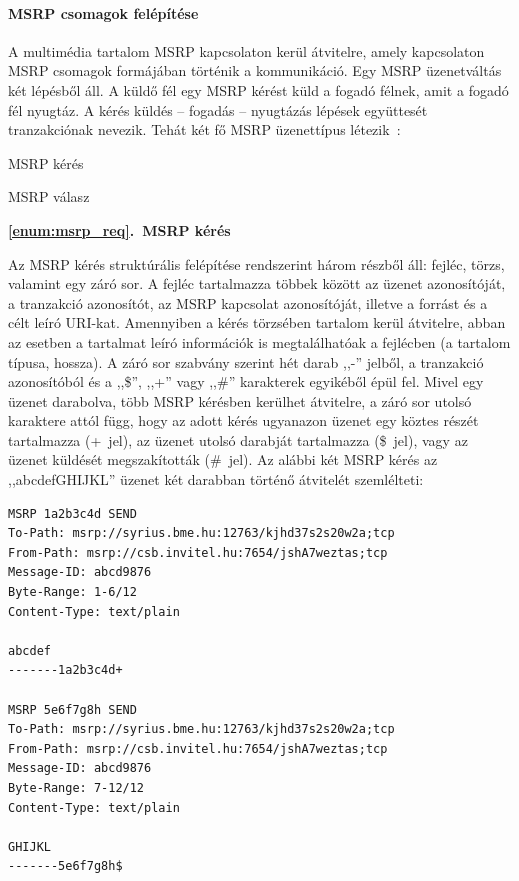 \paragraph{MSRP csomagok felépítése\\}
\label{sec:msrp_chunks}

A multimédia tartalom MSRP kapcsolaton kerül átvitelre, amely kapcsolaton MSRP csomagok formájában történik a kommunikáció. Egy MSRP üzenetváltás két lépésből áll. A küldő fél egy MSRP kérést küld a fogadó félnek, amit a fogadó fél nyugtáz. A kérés küldés -- fogadás -- nyugtázás lépések együttesét tranzakciónak nevezik. Tehát két fő MSRP üzenettípus létezik~\cite{rfc4975}:
\begin{myenumerate}
\item \label{enum:msrp_req} MSRP kérés
\item \label{enum:msrp_resp} MSRP válasz
\end{myenumerate}
\bigskip

\noindent
{\bf \ref{enum:msrp_req}.~MSRP kérés}

Az MSRP kérés struktúrális felépítése rendszerint három részből áll: fejléc, törzs, valamint egy záró sor. A fejléc tartalmazza többek között az üzenet azonosítóját, a tranzakció azonosítót, az MSRP kapcsolat azonosítóját, illetve a forrást és a célt leíró URI-kat. Amennyiben a kérés törzsében tartalom kerül átvitelre, abban az esetben a tartalmat leíró információk is megtalálhatóak a fejlécben (a tartalom típusa, hossza). A záró sor szabvány szerint hét darab ,,-'' jelből, a tranzakció azonosítóból és a ,,\$'', ,,+'' vagy ,,\#'' karakterek egyikéből épül fel. Mivel egy üzenet darabolva, több MSRP kérésben kerülhet átvitelre, a záró sor utolsó karaktere attól függ, hogy az adott kérés ugyanazon üzenet egy köztes részét tartalmazza (+~jel), az üzenet utolsó darabját tartalmazza (\$~jel), vagy az üzenet küldését megszakították (\#~jel). Az alábbi két MSRP kérés az ,,abcdefGHIJKL'' üzenet két darabban történő átvitelét szemlélteti:

\fontsize{10}{10}
\begin{verbatim}
MSRP 1a2b3c4d SEND
To-Path: msrp://syrius.bme.hu:12763/kjhd37s2s20w2a;tcp
From-Path: msrp://csb.invitel.hu:7654/jshA7weztas;tcp
Message-ID: abcd9876
Byte-Range: 1-6/12
Content-Type: text/plain

abcdef
-------1a2b3c4d+

MSRP 5e6f7g8h SEND
To-Path: msrp://syrius.bme.hu:12763/kjhd37s2s20w2a;tcp
From-Path: msrp://csb.invitel.hu:7654/jshA7weztas;tcp
Message-ID: abcd9876
Byte-Range: 7-12/12
Content-Type: text/plain

GHIJKL
-------5e6f7g8h$
\end{verbatim}
\fontsize{12}{12} 

